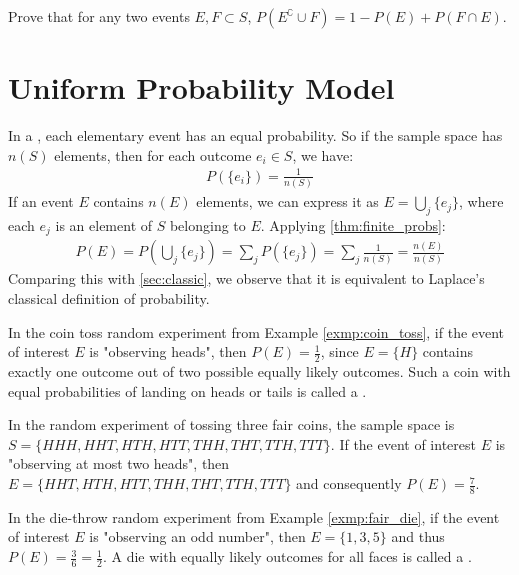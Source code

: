 \begin{ex}
	Prove that for any two events \( E, F \subset S \), \( P(E^\complement \cup F) = 1 - P(E) + P(F \cap E) \).
\end{ex}

\section{Uniform Probability Model}

In a , each elementary event has an equal probability.
So if the sample space has \( n(S) \) elements, then for each outcome \( e_i \in S \), we have:
\begin{align*}
	P(\{e_i\}) = \frac{1}{n(S)}
\end{align*}
If an event \( E \) contains \( n(E) \) elements,
we can express it as \( E = \bigcup_{j} \{e_j\} \), where each \( e_j \) is an element of \( S \) belonging to \( E \).
Applying \autoref{thm:finite_probs}:
\begin{align*}
	P(E) = P(\bigcup_{j} \{e_j\}) = \sum_{j} P(\{e_j\}) = \sum_{j} \frac{1}{n(S)} = \frac{n(E)}{n(S)}
\end{align*}
Comparing this with \autoref{sec:classic}, we observe that it is equivalent to Laplace's classical definition of probability.

\begin{exmp}
	In the coin toss random experiment from Example \autoref{exmp:coin_toss}, if the event of interest \( E \) is "observing heads",
	then \( P(E) = \frac{1}{2} \), since \( E = \{ H \} \) contains exactly one outcome out of two possible equally likely outcomes.
	Such a coin with equal probabilities of landing on heads or tails is called a .
\end{exmp}

\begin{exmp}\label{exmp:three_fair_coins}
	In the random experiment of tossing three fair coins, the sample space is
	\( S = \{ HHH, HHT, HTH, HTT, THH, THT, TTH, TTT \} \).
	If the event of interest \( E \) is "observing at most two heads",
	then \( E = \{ HHT, HTH, HTT, THH, THT, TTH, TTT \} \) and consequently \( P(E) = \frac{7}{8} \).
\end{exmp}

\begin{exmp}
	In the die-throw random experiment from Example \autoref{exmp:fair_die}, if the event of interest \( E \) is "observing an odd number",
	then \( E = \{ 1, 3, 5 \} \) and thus \( P(E) = \frac{3}{6} = \frac{1}{2} \).
	A die with equally likely outcomes for all faces is called a .
\end{exmp}

